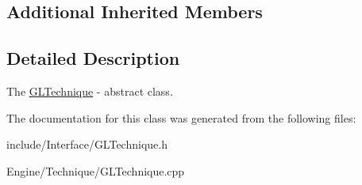 \subsection*{Additional Inherited Members}


\subsection{Detailed Description}
The \hyperlink{classEngine_1_1GLTechnique}{G\+L\+Technique} -\/ abstract class. 

The documentation for this class was generated from the following files\+:\begin{DoxyCompactItemize}
\item 
include/\+Interface/G\+L\+Technique.\+h\item 
Engine/\+Technique/G\+L\+Technique.\+cpp\end{DoxyCompactItemize}
